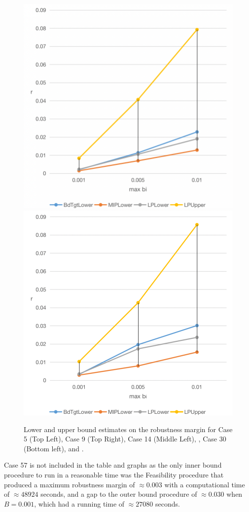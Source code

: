 \begin{figure}[htp!]
\begin{center}
  \includegraphics[width=.45\linewidth-0.2mm]{Figures/newcase30.png}\hfill
  \includegraphics[width=.45\linewidth-0.2mm]{Figures/newcase39.png}\\
\caption{Lower and upper bound estimates on the robustness margin for Case 5 (Top Left), Case 9 (Top Right), Case 14 (Middle Left), , Case 30 (Bottom left), and . }
\label{fig:Graphs1} 
\end{center}
\end{figure}

Case 57 is not included in the table and graphs as the only inner bound procedure to run in a reasonable time was the Feasibility procedure that produced a maximum robustness margin of $\approx 0.003$ with a computational time of $\approx 48924$ seconds, and a gap to the outer bound procedure of $\approx 0.030$ when $B=0.001$, which had a running time of $\approx 27080$ seconds.

